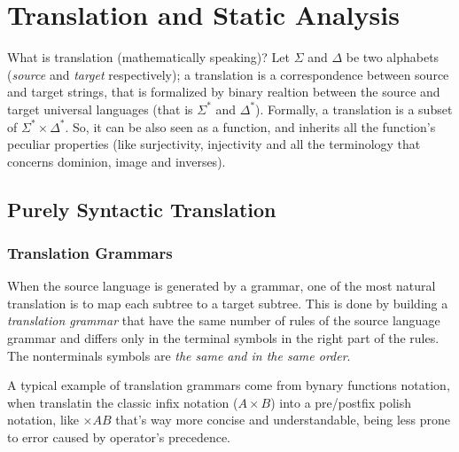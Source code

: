 \chapter{Translation and Static Analysis}
	What is translation (mathematically speaking)? Let $\Sigma$ and $\Delta$ be two alphabets (\emph{source} and \emph{target} respectively); a translation is a 
	correspondence between source and target strings, that is formalized by binary realtion between the source and target universal languages (that is $\Sigma^\ast$ 
	and $\Delta^\ast$). Formally, a translation is a subset of $\Sigma^\ast \times \Delta^\ast$. So, it can be also seen as a function, and inherits all the 
	function's peculiar properties (like surjectivity, injectivity and all the terminology that concerns dominion, image and inverses).
	
	\section{Purely Syntactic Translation}
		\subsection{Translation Grammars}
			When the source language is generated by a grammar, one of the most natural translation is to map each subtree to a target subtree. This is done by 
			building a \emph{translation grammar} that have the same number of rules of the source language grammar and differs only in the terminal symbols in 
			the right part of the rules. The nonterminals symbols are \emph{the same and in the same order}.

			A typical example of translation grammars come from bynary functions notation, when translatin the classic infix notation ($A \times B$) into a 
			pre/postfix polish notation, like $\times A B$ that's way more concise and understandable, being less prone to error caused by operator's precedence.

